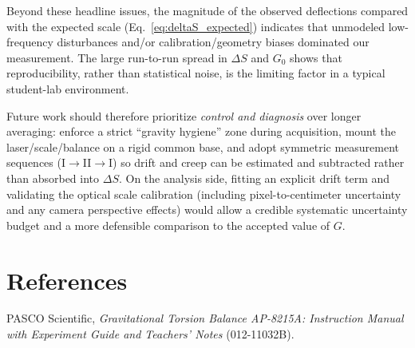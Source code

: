 \documentclass[11pt]{article}
\begin{document}
Beyond these headline issues, the magnitude of the observed deflections compared with the expected scale (Eq.~\eqref{eq:deltaS_expected}) indicates that unmodeled low-frequency disturbances and/or calibration/geometry biases dominated our measurement.
The large run-to-run spread in $\Delta S$ and $G_0$ shows that reproducibility, rather than statistical noise, is the limiting factor in a typical student-lab environment.

Future work should therefore prioritize \emph{control and diagnosis} over longer averaging: enforce a strict ``gravity hygiene'' zone during acquisition, mount the laser/scale/balance on a rigid common base, and adopt symmetric measurement sequences (I$\rightarrow$II$\rightarrow$I) so drift and creep can be estimated and subtracted rather than absorbed into $\Delta S$.
On the analysis side, fitting an explicit drift term and validating the optical scale calibration (including pixel-to-centimeter uncertainty and any camera perspective effects) would allow a credible systematic uncertainty budget and a more defensible comparison to the accepted value of $G$.

\section*{References}
PASCO Scientific, \emph{Gravitational Torsion Balance AP-8215A: Instruction Manual with Experiment Guide and Teachers' Notes} (012-11032B).
\end{document}
